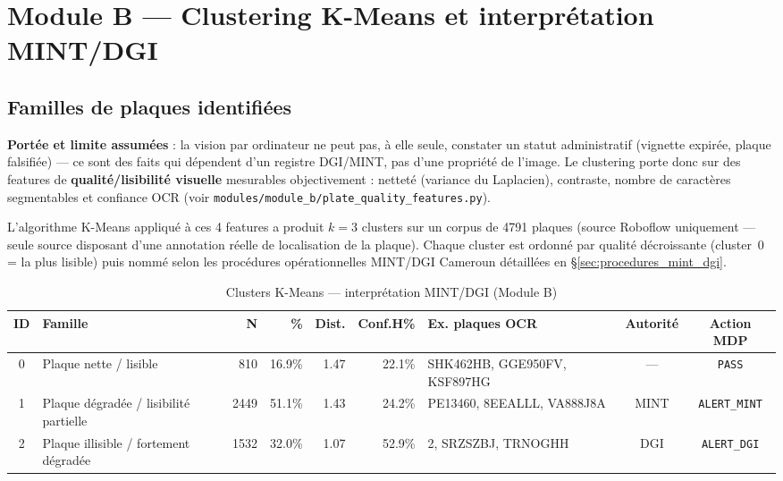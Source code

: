 \section{Module B — Clustering K-Means et interprétation MINT/DGI}
\label{sec:module_b_clusters}

\subsection{Familles de plaques identifiées}

\textbf{Portée et limite assumées} : la vision par ordinateur ne peut pas, à
elle seule, constater un statut administratif (vignette expirée, plaque
falsifiée) — ce sont des faits qui dépendent d'un registre DGI/MINT, pas
d'une propriété de l'image. Le clustering porte donc sur des features de
\textbf{qualité/lisibilité visuelle} mesurables objectivement : netteté
(variance du Laplacien), contraste, nombre de caractères segmentables et
confiance OCR (voir \texttt{modules/module\_b/plate\_quality\_features.py}).

L'algorithme K-Means appliqué à ces 4 features a produit $k=3$ clusters
sur un corpus de 4791 plaques (source Roboflow uniquement —
seule source disposant d'une annotation réelle de localisation de la plaque).
Chaque cluster est ordonné par qualité décroissante (cluster~0 = la plus
lisible) puis nommé selon les procédures opérationnelles MINT/DGI Cameroun
détaillées en §\ref{sec:procedures_mint_dgi}.

\begin{table}[H]
    \centering
    \caption{Clusters K-Means — interprétation MINT/DGI (Module B)}
    \label{tab:clusters_mint_dgi}
    \small
    \begin{tabular}{c|p{3cm}|r|r|r|r|p{2.4cm}|c|c}
        \hline
        \textbf{ID} & \textbf{Famille} & \textbf{N} & \textbf{\%} &
        \textbf{Dist.} & \textbf{Conf.H\%} & \textbf{Ex. plaques OCR} &
        \textbf{Autorité} & \textbf{Action MDP} \\
        \hline
        0 & Plaque nette / lisible & 810 & 16.9\% & 1.47 & 22.1\% & SHK462HB, GGE950FV, KSF897HG & — & \texttt{PASS} \\
        \hline
        1 & Plaque dégradée / lisibilité partielle & 2449 & 51.1\% & 1.43 & 24.2\% & PE13460, 8EEALLL, VA888J8A & MINT & \texttt{ALERT_MINT} \\
        \hline
        2 & Plaque illisible / fortement dégradée & 1532 & 32.0\% & 1.07 & 52.9\% & 2, SRZSZBJ, TRNOGHH & DGI & \texttt{ALERT_DGI} \\
        \hline
    \end{tabular}
\end{table}

